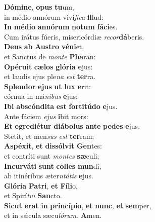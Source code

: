 \evenverse \textbf{Dó}\textbf{mi}\textbf{ne}, \textbf{o}\textbf{pus} \textbf{tu}um,~\*\\
\evenverse in médio annórum viví\textit{fi}\textit{ca} \textbf{il}lud:\\
\oddverse \textbf{In} \textbf{mé}\textbf{di}\textbf{o} \textbf{an}\textbf{nó}\textbf{rum} \textbf{no}\textbf{tum} \textbf{fá}\textbf{ci}es.~\*\\
\oddverse Cum irátus fúeris, misericórdiæ \textit{re}\textit{cor}\textbf{dá}beris.\\
\evenverse \textbf{De}\textbf{us} \textbf{ab} \textbf{Au}\textbf{stro} \textbf{vé}\textbf{ni}et,~\*\\
\evenverse et Sanctus de \textit{mon}\textit{te} \textbf{Pha}ran:\\
\oddverse \textbf{O}\textbf{pé}\textbf{ru}\textbf{it} \textbf{cæ}\textbf{los} \textbf{gló}\textbf{ri}\textbf{a} \textbf{e}jus:~\*\\
\oddverse et laudis ejus ple\textit{na} \textit{est} \textbf{ter}ra.\\
\evenverse \textbf{Splen}\textbf{dor} \textbf{e}\textbf{jus} \textbf{ut} \textbf{lux} \textbf{e}rit:~\*\\
\evenverse córnua in má\textit{ni}\textit{bus} \textbf{e}jus:\\
\oddverse \textbf{I}\textbf{bi} \textbf{ab}\textbf{scón}\textbf{di}\textbf{ta} \textbf{est} \textbf{for}\textbf{ti}\textbf{tú}\textbf{do} \textbf{e}jus.~\*\\
\oddverse Ante fáciem \textit{e}\textit{jus} \textbf{i}bit mors:\\
\evenverse \textbf{Et} \textbf{e}\textbf{gre}\textbf{di}\textbf{é}\textbf{tur} \textbf{di}\textbf{á}\textbf{bo}\textbf{lus} \textbf{an}\textbf{te} \textbf{pe}\textbf{des} \textbf{e}jus.~\*\\
\evenverse Stetit, et men\textit{sus} \textit{est} \textbf{ter}ram;\\
\oddverse \textbf{A}\textbf{spé}\textbf{xit}, \textbf{et} \textbf{dis}\textbf{sól}\textbf{vit} \textbf{Gen}tes:~\*\\
\oddverse et contríti sunt \textit{mon}\textit{tes} \textbf{sæ}culi;\\
\evenverse \textbf{In}\textbf{cur}\textbf{vá}\textbf{ti} \textbf{sunt} \textbf{col}\textbf{les} \textbf{mun}di,~\*\\
\evenverse ab itinéribus æter\textit{ntá}\textit{tis} \textbf{e}jus.\\
\oddverse \textbf{Gló}\textbf{ri}\textbf{a} \textbf{Pa}\textbf{tri}, \textbf{et} \textbf{Fí}\textbf{li}o,~\*\\
\oddverse et Spirí\textit{tu}\textit{i} \textbf{San}cto.\\
\evenverse \textbf{Si}\textbf{cut} \textbf{e}\textbf{rat} \textbf{in} \textbf{prin}\textbf{cí}\textbf{pi}\textbf{o}, \textbf{et} \textbf{nunc}, \textbf{et} \textbf{sem}per,~\*\\
\evenverse et in sǽcula sæcu\textit{ló}\textit{rum}. \textbf{A}men.\\
